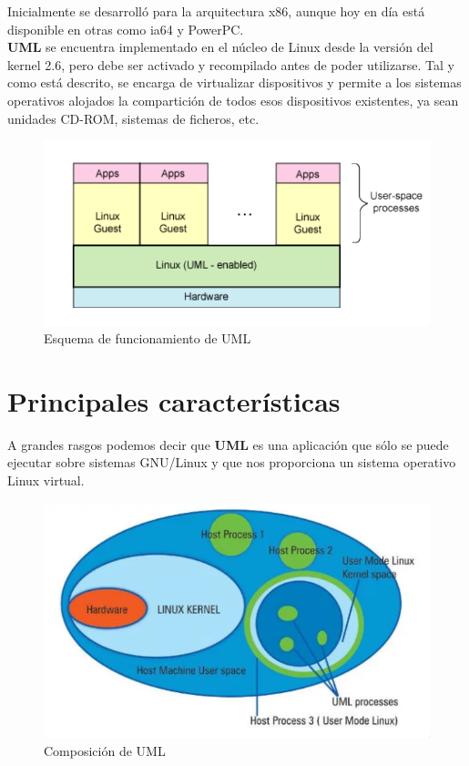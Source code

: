 \documentclass[11pt,twoside,titlepage,a4paper]{article}
\theoremstyle{definition}
\theoremstyle{plain_rojo}
\theoremstyle{remark}
\begin{document}
Inicialmente se desarrolló para la arquitectura x86, aunque hoy en día está 
disponible en otras como ia64 y PowerPC. 
\\

\textbf{UML} se encuentra implementado en el núcleo de Linux desde la versión 
del kernel 2.6, pero debe ser activado y recompilado antes de poder 
utilizarse. Tal y como está descrito, se encarga de virtualizar dispositivos 
y permite a los sistemas operativos alojados la compartición de todos esos 
dispositivos existentes, ya sean unidades CD-ROM, sistemas de ficheros, etc.

\begin{figure}[htp]
\centering
\includegraphics[scale=0.50]{figura_1.png}
\caption{Esquema de funcionamiento de UML}
\label{}
\end{figure}

\section{Principales características}

A grandes rasgos podemos decir que \textbf{UML} es una aplicación que sólo se 
puede ejecutar sobre sistemas GNU/Linux y que nos proporciona un sistema 
operativo Linux virtual.
\\

\begin{figure}[htp]
\centering
\includegraphics[scale=0.50]{figura_2.png}
\caption{Composición de UML}
\label{}
\end{figure}
\end{document}
